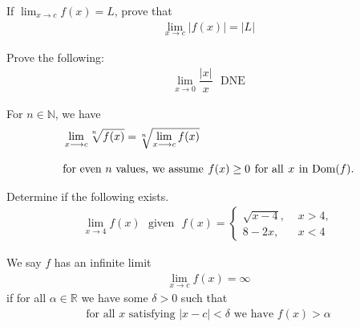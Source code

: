 \begin{exercise}
If $\lim_{x \longrightarrow c} f(x) = L$, prove that 
\begin{align*}
    \lim_{x \longrightarrow c} \lvert f(x) \rvert = \lvert L \rvert 
\end{align*}
\end{exercise}

\begin{exercise}
Prove the following:
\begin{align*}
    \lim_{x \longrightarrow 0} \dfrac{\lvert x \rvert}{x} \hspace{8pt} \text{DNE}
\end{align*}
\end{exercise}

\begin{theorem}
For $n \in \mathbb{N}$, we have
\begin{align*}
    &\lim_{x \longrightarrow c} \sqrt[\leftroot{2}\uproot{2}n]{f(x)} = \sqrt[\leftroot{2}\uproot{2}n]{\lim_{x \longrightarrow c} f(x)}\\[2ex]
    &\text{for even $n$ values, we assume} \hspace{4pt} f(x) \geq 0 \hspace{4pt} \text{for all} \hspace{4pt} x \hspace{4pt} \text{in Dom($f$)}. 
\end{align*}
\end{theorem}

\begin{exercise}
Determine if the following exists.
\begin{align*}
    \lim_{x \longrightarrow 4} f(x) \hspace{8pt} \text{given} \hspace{8pt} f(x) = 
    \begin{cases}
    \sqrt{x-4}, \hspace{4pt} &x > 4,\\[2ex]
    8-2x, \hspace{4pt} &x < 4
    \end{cases}
\end{align*}
\end{exercise}

\begin{definition}
We say $f$ has an infinite limit 
\begin{align*}
    \lim_{x \longrightarrow c} f(x) = \infty
\end{align*}
if for all $\alpha \in \mathbb{R}$ we have some $\delta > 0$ such that
\begin{align*}
    \text{for all} \hspace{4pt} x \hspace{4pt} \text{satisfying} \hspace{4pt} \lvert x - c \rvert < \delta \hspace{4pt} \text{we have} \hspace{4pt} f(x) > \alpha
\end{align*}
\end{definition}


